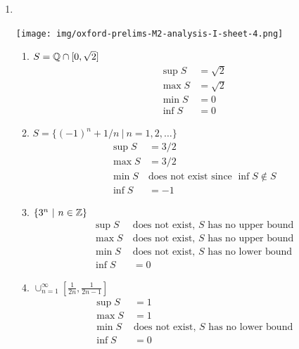 \begin{enumerate}
\begin{proof}
    Then $\sup S$ exists by completeness of the reals.

    By {\bf 4.9} (Approximation Property of the supremum) there exists $2^k \in S$ such that
    \begin{align*}
      \sup S - \frac{1}{2} < 2^k \leq \sup S.
    \end{align*}
    Note that $k+1 \in \N$ therefore $2^{k+1} = 2^k + 2^k \in S$. Therefore
    \begin{align*}
      \sup S - \frac{1}{2} + 2^k &< 2^{k+1} \leq \sup S\\
      \sup S &\leq \sup S + \frac{1}{2} - 2^k < \sup S,
    \end{align*}
    a contradiction. Therefore no upper bound for $S$ exists.
  \end{proof}

\item~\\
  \begin{mdframed}
    \texttt{[image: img/oxford-prelims-M2-analysis-I-sheet-4.png]}
  \end{mdframed}
  \begin{enumerate}
  \item $S = \mathbb{Q} \cap [0, \sqrt 2]$
    \begin{align*}
      \sup S &= \sqrt 2\\
      \max S &= \sqrt 2\\
      \min S &= 0\\
      \inf S &= 0
    \end{align*}
  \item $S = \{(-1)^n + 1/n ~|~ n=1,2,\ldots\}$
    \begin{align*}
      \sup S &= 3/2\\
      \max S &= 3/2\\
      \min S ~&\text{does not exist since $\inf S \not\in S$}\\
      \inf S &= -1
    \end{align*}
  \item $\{3^n ~|~ n \in \mathbb{Z}\}$
    \begin{align*}
      \sup S ~&\text{does not exist, $S$ has no upper bound}\\
      \max S ~&\text{does not exist, $S$ has no upper bound}\\
      \min S ~&\text{does not exist, $S$ has no lower bound}\\
      \inf S &= 0
    \end{align*}
  \item $\cup_{n=1}^\infty [\frac{1}{2n}, \frac{1}{2n - 1}]$
    \begin{align*}
      \sup S ~&= 1\\
      \max S ~&= 1\\
      \min S ~&\text{does not exist, $S$ has no lower bound}\\
      \inf S ~&=0
    \end{align*}
  \end{enumerate}


\end{enumerate}
